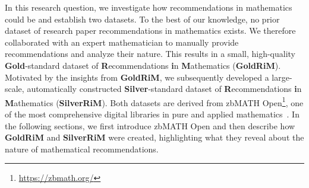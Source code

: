 \documentclass[sigconf,anonymous]{acmart}
\begin{document}
In this research question, we investigate how recommendations in mathematics could be and establish two datasets.
To the best of our knowledge, no prior dataset of research paper recommendations in mathematics exists.
We therefore collaborated with an expert mathematician to manually provide recommendations and analyze their nature.
This results in a small, high-quality \textbf{Gold}-standard dataset of \textbf{R}ecommendations \textbf{i}n \textbf{M}athematics (\textbf{GoldRiM}).
Motivated by the insights from \textbf{GoldRiM}, we subsequently developed a large-scale, automatically constructed \textbf{Silver}-standard dataset of \textbf{R}ecommendations \textbf{i}n \textbf{M}athematics (\textbf{SilverRiM}).
Both datasets are derived from zbMATH Open\footnote{\url{https://zbmath.org/}}, one of the most comprehensive digital libraries in pure and applied mathematics~\cite{deb2024zbmathovrvw}.
In the following sections, we first introduce zbMATH Open and then describe how \textbf{GoldRiM} and \textbf{SilverRiM} were created, highlighting what they reveal about the nature of mathematical recommendations.
\end{document}
